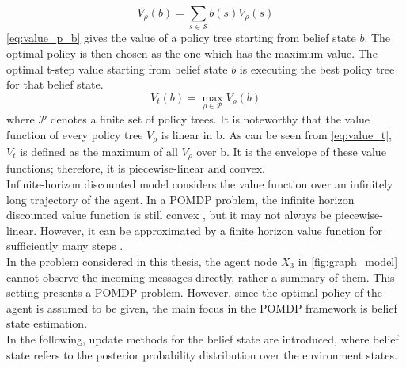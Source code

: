 \begin{equation}
V_{\rho}(b)=\sum_{s \in \mathcal{S}} b(s) V_{\rho}(s)
\label{eq:value_p_b}
\end{equation}
\autoref{eq:value_p_b} gives the value of a policy tree starting from belief state $ b $. The optimal policy is then chosen as the one which has the maximum value. The optimal t-step value starting from belief state $ b $ is executing the best policy tree for that belief state.
\begin{equation}
V_{t}(b)=\max _{\rho \in \mathcal{P}} V_\rho(b)
\label{eq:value_t}
\end{equation}
where $ \mathcal{P} $ denotes a finite set of policy trees.
It is noteworthy that the value function of every policy tree $ V_\rho $ is linear in b. As can be seen from \autoref{eq:value_t}, $ V_t $ is defined as the maximum of all $ V_\rho $ over b. It is the envelope of these value functions; therefore, it is piecewise-linear and convex.\\
Infinite-horizon discounted model considers the value function over an infinitely long trajectory of the agent. In a POMDP problem, the infinite horizon discounted value function is still convex \cite{White1980}, but it may not always be piecewise-linear. However, it can be approximated by a finite horizon value function for sufficiently many steps \cite{Sawaki1978, Edward2019}.\\
In the problem considered in this thesis, the agent node $ X_{3} $ in \autoref{fig:graph_model} cannot observe the incoming messages directly, rather a summary of them. This setting presents a POMDP problem. However, since the optimal policy of the agent is assumed to be given, the main focus in the POMDP framework is belief state estimation. \\
In the following, update methods for the belief state are introduced, where belief state refers to the posterior probability distribution over the environment states.

